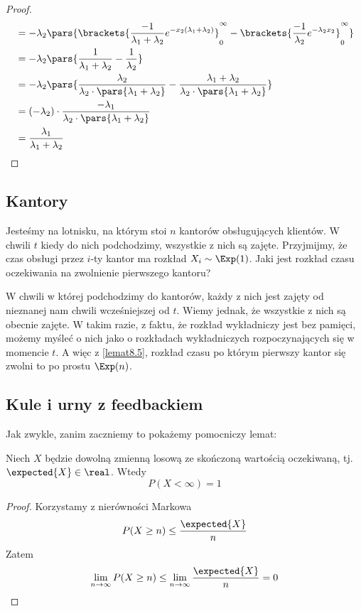 \begin{proof}
{\begin{align*}
		                         & = -\lambda_2 \pars{\brackets{\frac{-1}{\lambda_1 + \lambda_2} e^{-x_2(\lambda_1 + \lambda_2)}}_{0}^{\infty} - \brackets{\frac{-1}{\lambda_2} e^{-\lambda_2 x_2}}_{0}^{\infty}}   \\
		                         & = -\lambda_2 \pars{\frac{1}{\lambda_1 + \lambda_2} - \frac{1}{\lambda_2}}                                                                                                        \\
		                         & = -\lambda_2 \pars{\frac{\lambda_2}{\lambda_2 \cdot \pars{\lambda_1 + \lambda_2}} - \frac{\lambda_1 + \lambda_2}{\lambda_2 \cdot \pars{\lambda_1 + \lambda_2}}}                  \\
		                         & = (-\lambda_2)\cdot \frac{-\lambda_1}{\lambda_2 \cdot \pars{\lambda_1 + \lambda_2}}                                                                                              \\
		                         & = \frac{\lambda_1}{\lambda_1 + \lambda_2}
	\end{align*}
	}
\end{proof}

\subsection{Kantory}
Jesteśmy na lotnisku, na którym stoi \(n\) kantorów obsługujących klientów. W chwili \(t\) kiedy do nich podchodzimy, wszystkie z nich są zajęte. Przyjmijmy, że czas obsługi przez \(i\)-ty kantor ma rozkład \(X_i \sim \Exp(1)\). Jaki jest rozkład czasu oczekiwania na zwolnienie pierwszego kantoru?

W chwili w której podchodzimy do kantorów, każdy z nich jest zajęty od nieznanej nam chwili wcześniejszej od \(t\). Wiemy jednak, że wszystkie z nich są obecnie zajęte. W takim razie, z faktu, że rozkład wykładniczy jest bez pamięci, możemy myśleć o nich jako o rozkładach wykładniczych rozpoczynających się w momencie \(t\). A więc z \ref{lemat8.5}, rozkład czasu po którym pierwszy kantor się zwolni to po prostu \(\Exp(n)\).

\subsection{Kule i urny z feedbackiem}
Jak zwykle, zanim zaczniemy to pokażemy pomocniczy lemat:
\begin{lemma}
	\label{if-expected-is-finite-then-variable-is-finite}
	Niech \( X \) będzie dowolną zmienną losową ze skończoną wartością oczekiwaną, tj. \( \expected{X} \in \real \).
	Wtedy
	\[
		P(X < \infty) = 1
	\]
\end{lemma}
\begin{proof}
	Korzystamy z nierówności Markowa
	\[
		P(X \geq n) \leq \frac{\expected{X}}{n}
	\]
	Zatem
	\[
		\lim_{n \rightarrow \infty} P(X \geq n) \leq \lim_{n \rightarrow \infty} \frac{\expected{X}}{n} = 0
	\]
\end{proof}


